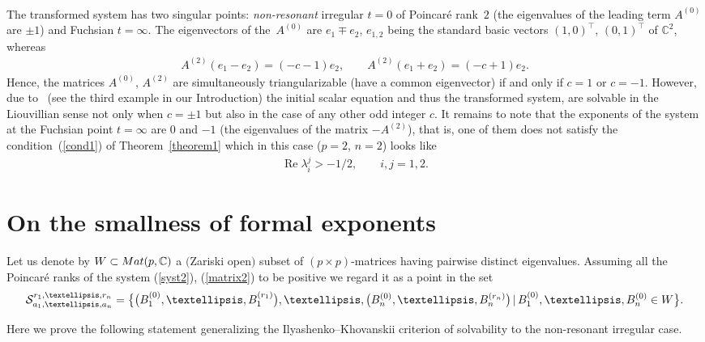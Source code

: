 \documentclass[11pt]{article}
\numberwithin{equation}{section}
\begin{document}
\begin{Example}
\begin{gather*}
\end{gather*}
The transformed system has two singular points: {\it non-resonant} irregular $t=0$ of Poincar\'e rank~$2$ (the eigenvalues of the leading term $A^{(0)}$ are $\pm1$) and Fuchsian $t=\infty$. The eigenvectors of the~$A^{(0)}$ are $e_1\mp e_2$, $e_{1,2}$ being the standard basic vectors $(1,0)^{\top}$, $(0,1)^{\top}$ of ${\mathbb C}^2$, whereas
\begin{gather*}
A^{(2)}(e_1-e_2)=(-c-1)e_2, \qquad A^{(2)}(e_1+e_2)=(-c+1)e_2.
\end{gather*}
Hence, the matrices $A^{(0)}$, $A^{(2)}$ are simultaneously triangularizable (have a common eigenvector) if and only if $c=1$ or $c=-1$. However, due to~\cite{MMN} (see the third example in our Introduction) the initial scalar equation and thus the transformed system, are solvable in the Liouvillian sense not only when $c=\pm1$ but also in the case of any other odd integer $c$. It remains to note that the exponents of the system at the Fuchsian point $t=\infty$ are $0$ and $-1$ (the eigenvalues of the matrix $-A^{(2)}$), that is, one of them does not satisfy the condition~(\ref{cond1}) of Theorem~\ref{theorem1} which in this case ($p=2$, $n=2$) looks like
\begin{gather*}
\operatorname{Re}\lambda_i^j>-1/2, \qquad i,j=1,2.
\end{gather*}
\end{Example}

\section{On the smallness of formal exponents}\label{section3}

Let us denote by $W\subset{\rm Mat}(p,{\mathbb C})$ a $($Zariski open$)$ subset of $(p\times p)$-matrices having pairwise
distinct eigenvalues. Assuming all the Poincar\'e ranks of the system (\ref{syst2}), (\ref{matrix2}) to be positive we regard it as a point in the set
\begin{gather*}
{\cal S}_{a_1,\ldots,a_n}^{r_1,\ldots,r_n}=\bigl\{ \big(B^{(0)}_1,\ldots,B^{(r_1)}_1\big),\ldots,\big(B^{(0)}_n,\ldots,B^{(r_n)}_n\big) \,|\, B^{(0)}_1,\ldots,B^{(0)}_n \in W \bigr\}.
\end{gather*}

Here we prove the following statement generalizing the Ilyashenko--Khovanskii criterion of solvability to the non-resonant
irregular case.
\end{document}
